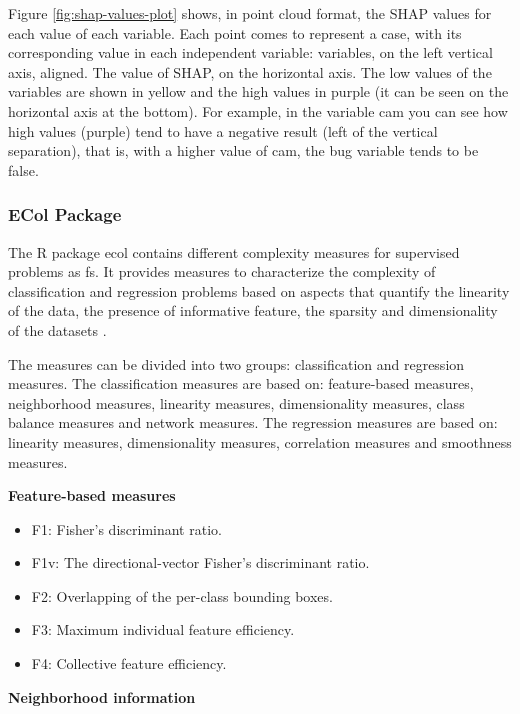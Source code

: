 \begin{enumerate}
    Figure \ref{fig:shap-values-plot} shows, in point cloud format, the SHAP values for each value of each variable. Each point comes to represent a case, with its corresponding value in each independent variable: variables, on the left vertical axis, aligned. The value of SHAP, on the horizontal axis. The low values of the variables are shown in yellow and the high values in purple (it can be seen on the horizontal axis at the bottom). For example, in the variable \acrshort{cam} you can see how high values (purple) tend to have a negative result (left of the vertical separation), that is, with a higher value of \acrshort{cam}, the bug variable tends to be false.
\end{enumerate}

\subsubsection{ECol Package}
\label{sec:ecol-package}

The R package \acrfull{ecol} contains different complexity measures for supervised problems as \acrlong{fs}. It provides measures to characterize the complexity of classification and regression problems based on aspects that quantify the linearity of the data, the presence of informative feature, the sparsity and dimensionality of the datasets \cite{ecol-article}.

The measures can be divided into two groups: classification and regression measures. The classification measures are based on: feature-based measures, neighborhood measures, linearity measures, dimensionality measures, class balance measures and network measures. The regression measures are based on: linearity measures, dimensionality measures, correlation measures and smoothness measures.

\textbf{Feature-based measures}

\begin{itemize}
    \item F1: Fisher's discriminant ratio.
    \item F1v: The directional-vector Fisher's discriminant ratio.
    \item F2: Overlapping of the per-class bounding boxes.
    \item F3: Maximum individual feature efficiency.
    \item F4: Collective feature efficiency.
\end{itemize}
    
\textbf{Neighborhood information}

